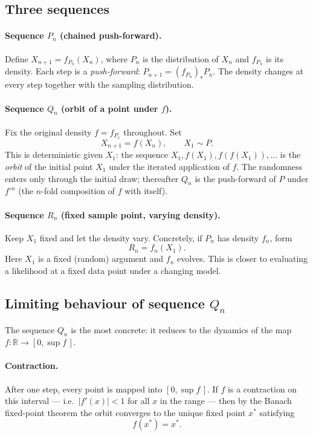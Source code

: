 \documentclass[a4paper,oneside,12pt]{extarticle}
\theoremstyle{plain}
\theoremstyle{definition}
\theoremstyle{remark}
\begin{document}
\subsection{Three sequences}

\paragraph{Sequence $P_n$ (chained push-forward).}
Define $X_{n+1} = f_{P_n}(X_n)$, where $P_n$ is the distribution
of $X_n$ and $f_{P_n}$ is its density.  Each step is a
\emph{push-forward}: $P_{n+1} = (f_{P_n})_* P_n$.  The density
changes at every step together with the sampling distribution.

\paragraph{Sequence $Q_n$ (orbit of a point under $f$).}
Fix the original density $f = f_{P_1}$ throughout.  Set
\[
  X_{n+1} = f(X_n), \qquad X_1 \sim P.
\]
This is deterministic given $X_1$: the sequence $X_1, f(X_1),
f(f(X_1)), \ldots$ is the \emph{orbit} of the initial point $X_1$
under the iterated application of $f$.  The randomness enters only
through the initial draw; thereafter $Q_n$ is the push-forward of
$P$ under $f^{\circ n}$ (the $n$-fold composition of $f$ with itself).

\paragraph{Sequence $R_n$ (fixed sample point, varying density).}
Keep $X_1$ fixed and let the density vary.  Concretely, if $P_n$
has density $f_n$, form
\[
  R_n = f_n(X_1).
\]
Here $X_1$ is a fixed (random) argument and $f_n$ evolves.  This
is closer to evaluating a likelihood at a fixed data point under a
changing model.

\subsection{Limiting behaviour of sequence $Q_n$}

The sequence $Q_n$ is the most concrete: it reduces to the dynamics
of the map $f: \mathbb{R} \to [0,\sup f\,]$.

\paragraph{Contraction.}
After one step, every point is mapped into $[0,\sup f\,]$.  If $f$
is a contraction on this interval --- i.e.\ $|f'(x)| < 1$ for all
$x$ in the range --- then by the Banach fixed-point theorem the orbit
converges to the unique fixed point $x^*$ satisfying
\[
  f(x^*) = x^*.
\]
\end{document}
